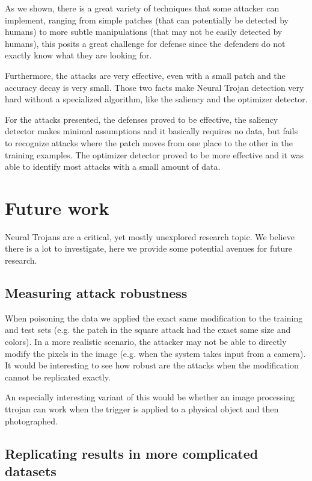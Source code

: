\documentclass[letterpaper, 10 pt, conference]{ieeeconf}  %
\begin{document}
As we shown, there is a great variety of techniques that some attacker can
implement, ranging from simple patches (that can potentially be detected by
humans) to more subtle manipulations (that may not be easily detected
by humans), this posits a great challenge for defense since the defenders do
not exactly know what they are looking for.

Furthermore, the attacks are very effective, even with a small patch and the
accuracy decay is very small. Those two facts make Neural Trojan detection
very hard without a specialized algorithm, like the saliency and the
optimizer detector.

For the attacks presented, the defenses proved to be effective, the saliency
detector makes minimal assumptions and it basically requires no data, but fails
to recognize attacks where the patch moves from one place to the other in the
training examples. The optimizer detector proved to be more effective and it
was able to identify most attacks with a small amount of data.


\section{Future work}

Neural Trojans are a critical, yet mostly unexplored research topic. We believe
there is a lot to investigate, here we provide some potential avenues for
future research.

\subsection{Measuring attack robustness}

When poisoning the data we applied the exact same modification to the training
and test sets (e.g. the patch in the square attack had the exact same size and
colors). In a more realistic scenario, the attacker may not be able to directly
modify the pixels in the image (e.g. when the system takes input from a
camera). It would be interesting to see how robust are the attacks when the
modification cannot be replicated exactly.

An especially interesting variant of this would be whether an image
processing ttrojan can work when the trigger is applied to a physical
object and then photographed.

\subsection{Replicating results in more complicated datasets}
\end{document}
